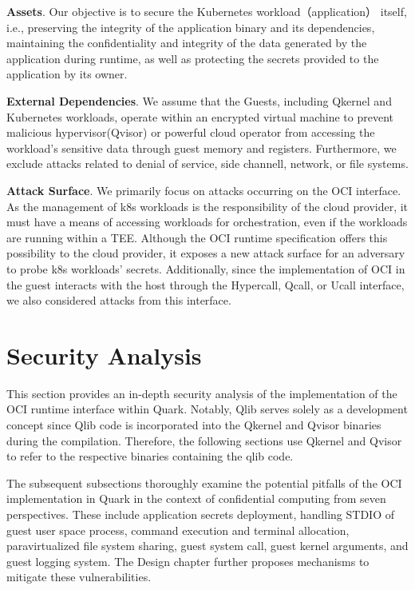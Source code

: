\textbf{Assets}. Our objective is to secure the Kubernetes workload（application） itself, i.e., preserving the integrity of the application binary and its dependencies, maintaining the confidentiality and integrity of the data generated by the 
application during runtime, as well as protecting the secrets provided to the application by its owner.

\textbf{External Dependencies}. We assume that the Guests, including Qkernel and Kubernetes workloads, operate within an encrypted virtual machine to prevent malicious hypervisor(Qvisor) or powerful cloud operator from accessing the workload’s 
sensitive data through guest memory and registers. Furthermore, we exclude attacks related to denial of service\cite*{DOS_ATTACK}, side channell\cite*{217454}, 
network, or file systems.

\textbf{Attack Surface}. We primarily focus on attacks occurring on the OCI interface\cite*{oci-runtime-spec}. As the management of k8s workloads is the responsibility of the cloud provider, it must have a means of accessing workloads for 
orchestration, even if the workloads are running within a TEE. Although the OCI runtime specification offers this possibility to the cloud provider, it exposes a new attack surface for an adversary to probe k8s workloads’ secrets. Additionally, 
since the implementation of OCI in the guest interacts with the host through the Hypercall, Qcall, or Ucall interface, we also considered attacks from this interface.

\section{Security Analysis}

This section provides an in-depth security analysis of the implementation of the OCI runtime interface within Quark.  Notably, Qlib serves solely as a development concept since Qlib code is incorporated into the Qkernel and Qvisor binaries during 
the compilation. Therefore, the following sections use Qkernel and Qvisor to refer to the respective binaries containing the qlib code.

The subsequent subsections thoroughly examine the potential pitfalls of the OCI implementation in Quark in the context of confidential computing from seven perspectives. These include application secrets deployment, handling  STDIO of guest user 
space process, command execution and terminal allocation, paravirtualized file system sharing, guest system call,  guest kernel arguments, and guest logging system. The Design chapter further proposes mechanisms to mitigate these vulnerabilities.

